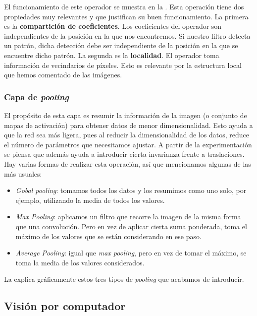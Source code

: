 El funcionamiento de este operador se muestra en la . Esta operación tiene dos propiedades muy relevantes y que justifican su buen funcionamiento. La primera es la \textbf{compartición de coeficientes}. Los coeficientes del operador son independientes de la posición en la que nos encontremos. Si nuestro filtro detecta un patrón, dicha detección debe ser independiente de la posición en la que se encuentre dicho patrón. La segunda es la \textbf{localidad}. El operador toma información de vecindarios de píxeles. Esto es relevante por la estructura local que hemos comentado de las imágenes.

\subsubsection{Capa de \textit{pooling}}

El propósito de esta capa es resumir la información de la imagen (o conjunto de mapas de activación) para obtener datos de menor dimensionalidad. Esto ayuda a que la red sea más ligera, pues al reducir la dimensionalidad de los datos, reduce el número de parámetros que necesitamos ajustar. A partir de la experimentación se piensa que además ayuda a introducir cierta invarianza frente a traslaciones. Hay varias formas de realizar esta operación, así que mencionamos algunas de las más usuales:

\begin{itemize}
	\item \textit{Gobal pooling}: tomamos todos los datos y los resumimos como uno solo, por ejemplo, utilizando la media de todos los valores.
	\item \textit{Max Pooling}: aplicamos un filtro que recorre la imagen de la misma forma que una convolución. Pero en vez de aplicar cierta suma ponderada, toma el máximo de los valores que se están considerando en ese paso.
	\item \textit{Average Pooling}: igual que \textit{max pooling}, pero en vez de tomar el máximo, se toma la media de los valores considerados.
\end{itemize}

La  explica gráficamente estos tres tipos de \textit{pooling} que acabamos de introducir.

\subsection{Visión por computador}

